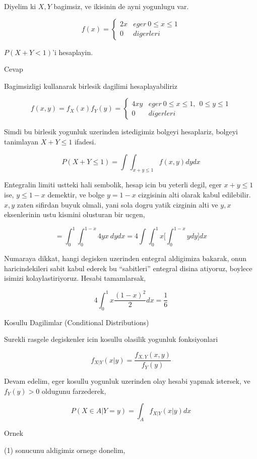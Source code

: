 \documentclass[12pt,fleqn]{article}\usepackage{../common}
\begin{document}
Diyelim ki $X,Y$ bagimsiz, ve ikisinin de ayni yogunlugu var.

\[ f(x) = 
\left\{ \begin{array}{ll}
2x & eger \ 0 \le x \le 1 \\
0 & digerleri
\end{array} \right.
 \]

$P(X+Y < 1)$'i hesaplayin. 

Cevap

Bagimsizligi kullanarak birlesik dagilimi hesaplayabiliriz

\[ f(x,y) = f_X(x)f_Y(y) = 
\left\{ \begin{array}{ll}
4xy & eger \ 0 \le x \le 1, \ \ 0 \le y \le 1 \\
0 & digerleri
\end{array} \right.
 \]

Simdi bu birlesik yogunluk uzerinden istedigimiz bolgeyi hesaplariz,
bolgeyi tanimlayan $X+Y \le 1$ ifadesi. 

\[ P(X+Y \le 1) = 
\int \int_{x+y \le 1} f(x,y) dy dx
 \]

Entegralin limiti ustteki hali sembolik, hesap icin bu yeterli degil, eger
$x+y \le 1$ ise,  $y \le 1-x$ demektir, ve bolge $y = 1-x$ cizgisinin alti
olarak kabul edilebilir. $x,y$ zaten sifirdan buyuk olmali, yani sola dogru
yatik cizginin alti ve $y,x$ eksenlerinin ustu kismini olusturan bir ucgen,

\[ =
\int _{ 0}^{1} \int _{ 0}^{1-x} 4yx \ dy dx = 
4 \int \int _{ 0}^{1} x \bigg[ \int _{ 0}^{1-x} ydy \bigg] dx
 \]

Numaraya dikkat, hangi degisken uzerinden entegral aldigimiza bakarak, onun
haricindekileri sabit kabul ederek bu ``sabitleri'' entegral disina
atiyoruz, boylece isimizi kolaylastiriyoruz. Hesabi tamamlarsak, 

\[ 4 \int _{ 0}^{1} x \frac{ (1- x)^2}{2} dx = \frac{ 1}{6} \]

Kosullu Dagilimlar (Conditional Distributions)

Surekli rasgele degiskenler icin kosullu olasilik yogunluk fonksiyonlari 

\[ f_{X|Y}(x|y) = \frac{ f_{X,Y}(x,y)}{f_Y(y)} \]

Devam edelim, eger kosullu yogunluk uzerinden olay hesabi yapmak istersek,
ve  $f_Y(y) > 0$ oldugunu farzederek, 

\[ P(X \in A | Y = y) = \int_A f_{X|Y}(x|y) dx \]


Ornek 

(1) sonucunu aldigimiz ornege donelim,
\end{document}
